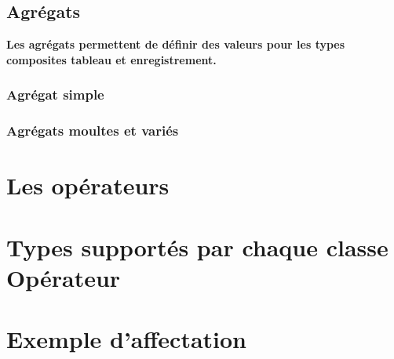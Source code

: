 \subsection{Agrégats}
\textbf{Les agrégats permettent de définir des valeurs pour les
types composites tableau et enregistrement.}
\subsubsection{Agrégat simple}
\subsubsection{Agrégats moultes et variés}

\section{Les opérateurs}
\section{Types supportés par chaque classe Opérateur}


\section{Exemple d'affectation}














